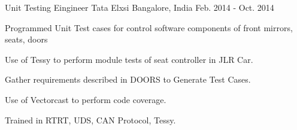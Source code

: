   \cventry
    {Unit Testing Eingineer} %
    {Tata Elxsi} %
    {Bangalore, India} %
    {Feb. 2014 - Oct. 2014} %
    {
      \begin{cvitems} %
      \item {Programmed Unit Test cases for control software components of front mirrors, seats, doors}
      \item {Use of Tessy to perform module tests of seat controller in JLR Car.}
      \item {Gather requirements described in DOORS to Generate Test Cases.}
      \item {Use of Vectorcast to perform code coverage.}
      \item {Trained in RTRT, UDS, CAN Protocol, Tessy. }
      \end{cvitems}
    }
